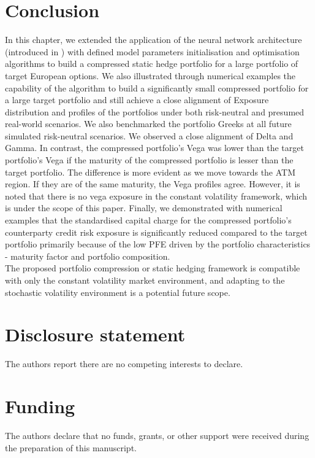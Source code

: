 \section{Conclusion}
In this chapter, we extended the application of the neural network architecture (introduced in \cite{dhandapani2024bermudan}) with defined model parameters initialisation and optimisation algorithms to build a compressed static hedge portfolio for a large portfolio of target European options. We also illustrated through numerical examples the capability of the algorithm to build a significantly small compressed portfolio for a large target portfolio and still achieve a close alignment of Exposure distribution and profiles of the portfolios under both risk-neutral and presumed real-world scenarios. We also benchmarked the portfolio Greeks at all future simulated risk-neutral scenarios. We observed a close alignment of Delta and Gamma. In contrast, the compressed portfolio's Vega was lower than the target portfolio's Vega if the maturity of the compressed portfolio is lesser than the target portfolio. The difference is more evident as we move towards the ATM region. If they are of the same maturity, the Vega profiles agree. However, it is noted that there is no vega exposure in the constant volatility framework, which is under the scope of this paper. Finally, we demonstrated with numerical examples that the standardised capital charge for the compressed portfolio's counterparty credit risk exposure is significantly reduced compared to the target portfolio primarily because of the low PFE driven by the portfolio characteristics - maturity factor and portfolio composition. \\ 

\noindent The proposed portfolio compression or static hedging framework is compatible with only the constant volatility market environment, and adapting to the stochastic volatility environment is a potential future scope.

\section*{Disclosure statement}

The authors report there are no competing interests to declare.

\section*{Funding}

The authors declare that no funds, grants, or other support were received during the preparation of this manuscript.


